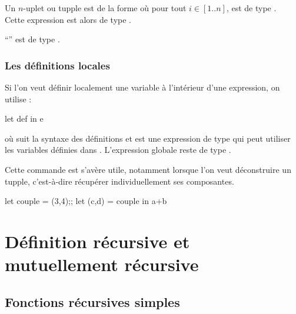  			\begin{Syntaxe}[tupples]
 			Un \(n\)-uplet ou tupple est de la forme  où pour tout \(i\in[1..n]\),  est de type . \\
 			Cette expression est alors de type .
 			\end{Syntaxe}
 			
 			\begin{Exemple}
 				``'' est de type .
 			\end{Exemple}
 			
 		\subsubsection{Les définitions locales}
 			
 			\vs{-2}
 			\begin{Syntaxe}
 			Si l'on veut définir localement une variable à l'intérieur d'une expression, on utilise : \vs{2}
 				\begin{Caml}
 							   let def in e
 				\end{Caml}
 			\vs{2}
 			où  suit la syntaxe des définitions et  est une expression de type  qui peut utiliser les variables définies dans . L'expression globale reste de type \caml{t}.
 			\end{Syntaxe}
 			
 			\vs{2}
 			Cette commande est s'avère utile, notamment lorsque l'on veut déconstruire un tupple, c'est-à-dire récupérer individuellement ses composantes.
 			
 			\vs{2}
 			\begin{Exemple}\vs{-7.5}
 				\begin{Caml}
		   let couple = (3,4);;
		   let (c,d) = couple in a+b
 				\end{Caml}
 			\end{Exemple}
 		
 \section{Définition récursive et mutuellement récursive}
 
 	\subsection{Fonctions récursives simples}
 	
